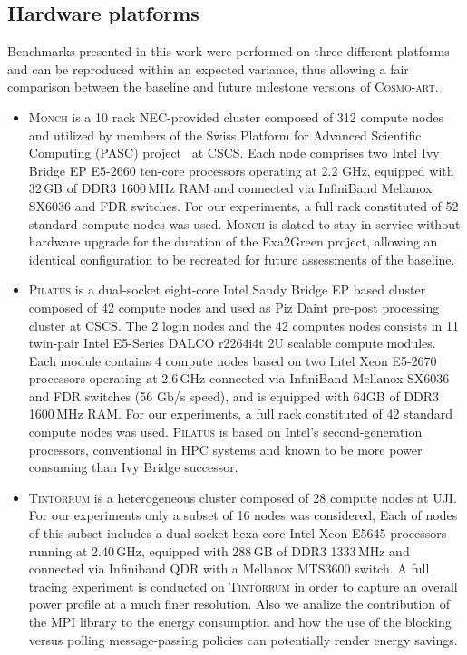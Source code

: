 \subsection{Hardware platforms}
\label{subsec:3.1}

Benchmarks presented  in this work  were performed on  three different
platforms  and can  be reproduced  within an  expected  variance, thus
allowing a  fair comparison between the baseline  and future milestone
versions of \textsc{Cosmo-art}.

\begin{itemize}
\item \textsc{Monch} is a 10 rack NEC-provided cluster composed
  of 312 compute  nodes and utilized by members  of the Swiss Platform
  for Advanced Scientific  Computing (PASC) project~\citep{PASC} at CSCS. Each
  node comprises two Intel Ivy Bridge EP  E5-2660 ten-core processors
  operating at  2.2 GHz, equipped with 32\,GB of DDR3 1600\,MHz  RAM and connected  via InfiniBand Mellanox  SX6036 and FDR switches. For our  experiments, 
  a full rack constituted  of  52
  standard compute  nodes was used.  \textsc{Monch} is  slated to stay
  in  service  without  hardware  upgrade  for  the  duration  of  the
  Exa2Green  project,  allowing   an  identical  configuration  to  be
  recreated for future assessments of the baseline.\\

\item \textsc{Pilatus} is a dual-socket eight-core Intel Sandy
  Bridge EP based cluster composed of 42 compute nodes and used as Piz
  Daint pre-post  processing cluster at  CSCS.  The 2 login  nodes and
  the 42 computes nodes consists in 11 twin-pair Intel E5-Series DALCO
  r2264i4t 2U scalable compute modules. Each module contains 4 compute
  nodes based  on two Intel Xeon E5-2670 processors operating  at 2.6\,GHz 
  connected  via InfiniBand Mellanox SX6036 and FDR  switches (56
  Gb/s speed), and is equipped with 64GB of DDR3 1600\,MHz RAM. For our
  experiments, a  full rack constituted  of 42 standard  compute nodes
  was  used. \textsc{Pilatus}  is based  on  Intel's second-generation
  processors, conventional in  HPC systems and known to  be more power
  consuming than Ivy Bridge successor.\\

\item \textsc{Tintorrum} is  a heterogeneous cluster composed of
  28 compute nodes at UJI. For our  experiments only a subset of 16 nodes was considered,  
  Each of nodes of this subset includes a dual-socket hexa-core Intel Xeon E5645 processors 
  running at 2.40\,GHz, equipped with 288\,GB  of DDR3 1333\,MHz and connected via Infiniband QDR with a Mellanox MTS3600 switch. A  full tracing  experiment is  conducted on
  \textsc{Tintorrum} in order to  capture an overall  power profile at a much
  finer resolution. Also we analize the contribution of the MPI library
  to the energy consumption and how the use of the blocking versus polling
  message-passing policies can potentially render energy savings.
\end{itemize}

